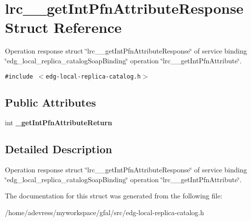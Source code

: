 \section{lrc\_\-\_\-get\-Int\-Pfn\-Attribute\-Response Struct Reference}
\label{structlrc____getIntPfnAttributeResponse}
Operation response struct \char`\"{}lrc\_\-\_\-get\-Int\-Pfn\-Attribute\-Response\char`\"{} of service binding \char`\"{}edg\_\-local\_\-replica\_\-catalog\-Soap\-Binding\char`\"{} operation \char`\"{}lrc\_\-\_\-get\-Int\-Pfn\-Attribute\char`\"{}.  


{\tt \#include $<$edg-local-replica-catalog.h$>$}

\subsection*{Public Attributes}
\begin{CompactItemize}
\item 
int \textbf{\_\-get\-Int\-Pfn\-Attribute\-Return}\label{structlrc____getIntPfnAttributeResponse_42939d6d4d13e2112c7f5b4074e07462}

\end{CompactItemize}


\subsection{Detailed Description}
Operation response struct \char`\"{}lrc\_\-\_\-get\-Int\-Pfn\-Attribute\-Response\char`\"{} of service binding \char`\"{}edg\_\-local\_\-replica\_\-catalog\-Soap\-Binding\char`\"{} operation \char`\"{}lrc\_\-\_\-get\-Int\-Pfn\-Attribute\char`\"{}. 



The documentation for this struct was generated from the following file:\begin{CompactItemize}
\item 
/home/adevress/myworkspace/gfal/src/edg-local-replica-catalog.h\end{CompactItemize}
